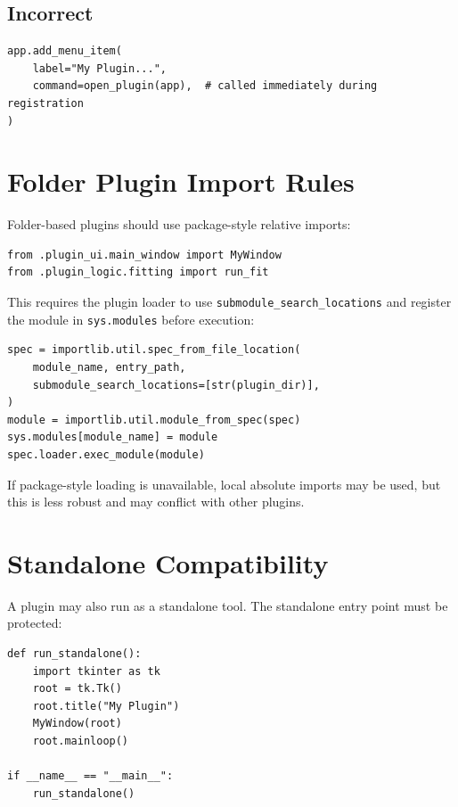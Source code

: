 \documentclass[11pt, a4paper]{article}
\begin{document}
\subsection*{Incorrect}
\begin{lstlisting}[style=python]
app.add_menu_item(
    label="My Plugin...",
    command=open_plugin(app),  # called immediately during registration
)
\end{lstlisting}

\section{Folder Plugin Import Rules}
\label{sec:imports}

Folder-based plugins should use package-style relative imports:

\begin{lstlisting}[style=python]
from .plugin_ui.main_window import MyWindow
from .plugin_logic.fitting import run_fit
\end{lstlisting}

This requires the plugin loader to use \texttt{submodule\_search\_locations} and register the module in \texttt{sys.modules} before execution:

\begin{lstlisting}[style=python]
spec = importlib.util.spec_from_file_location(
    module_name, entry_path,
    submodule_search_locations=[str(plugin_dir)],
)
module = importlib.util.module_from_spec(spec)
sys.modules[module_name] = module
spec.loader.exec_module(module)
\end{lstlisting}

If package-style loading is unavailable, local absolute imports may be used, but this is less robust and may conflict with other plugins.

\section{Standalone Compatibility}

A plugin may also run as a standalone tool. The standalone entry point must be protected:

\begin{lstlisting}[style=python]
def run_standalone():
    import tkinter as tk
    root = tk.Tk()
    root.title("My Plugin")
    MyWindow(root)
    root.mainloop()

if __name__ == "__main__":
    run_standalone()
\end{lstlisting}
\end{document}
